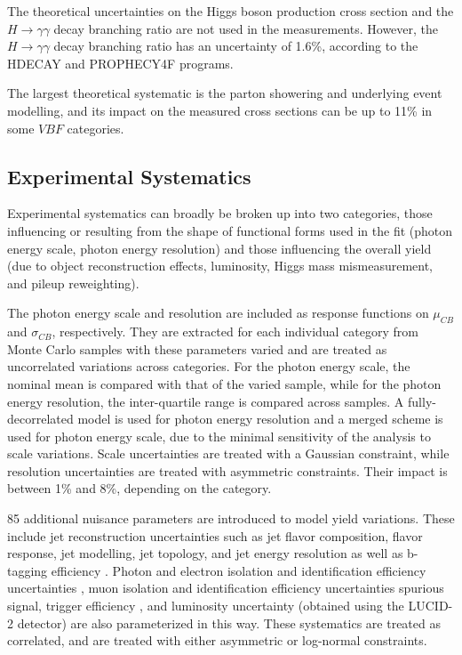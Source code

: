 The theoretical uncertainties on the Higgs boson production cross section and the $H \rightarrow \gamma \gamma$ decay branching ratio are not used in the measurements. However, the $H \rightarrow \gamma \gamma$ decay branching ratio has an uncertainty of 1.6\%, according to the HDECAY and PROPHECY4F programs.

The largest theoretical systematic is the parton showering and underlying event modelling, and its impact on the measured cross sections can be up to 11\% in some $VBF$ categories. 

\subsection{Experimental Systematics} \label{subsec:Experimentalsysts}

Experimental systematics can broadly be broken up into two categories, those influencing or resulting from the shape of functional forms used in the fit (photon energy scale, photon energy resolution) and those influencing the overall yield (due to object reconstruction effects, luminosity, Higgs mass mismeasurement, and pileup reweighting).

The photon energy scale and resolution are included as response functions on $\mu_{CB}$ and $\sigma_{CB}$, respectively. They are extracted for each individual category from Monte Carlo samples with these parameters varied and are treated as uncorrelated variations across categories. For the photon energy scale, the nominal mean is compared with that of the varied sample, while for the photon energy resolution, the inter-quartile range is compared across samples. A fully-decorrelated model is used for photon energy resolution and a merged scheme is used for photon energy scale, due to the minimal sensitivity of the analysis to scale variations. Scale uncertainties are treated with a Gaussian constraint, while resolution uncertainties are treated with asymmetric constraints. Their impact is between 1\% and 8\%, depending on the category.

85 additional nuisance parameters are introduced to model yield variations. These include jet reconstruction uncertainties such as jet flavor composition, flavor response, jet modelling, jet topology, and jet energy resolution \cite{coups127} as well as b-tagging efficiency \cite{jetuncs4}. Photon and electron isolation and identification efficiency uncertainties \cite{CERN-EP-2019-145}, muon isolation and identification efficiency uncertainties \cite{CERN-EP-2016-033} spurious signal, trigger efficiency \cite{triggerperformance}, and luminosity uncertainty (obtained using the LUCID-2 detector) \cite{LUCID} are also parameterized in this way. These systematics are treated as correlated, and are treated with either asymmetric or log-normal constraints.

